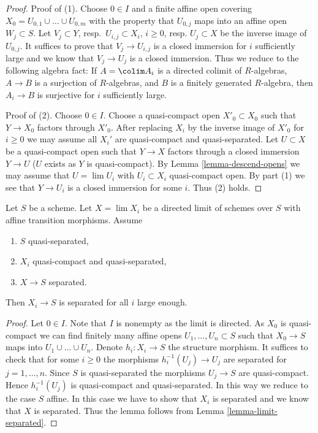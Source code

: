 \begin{proof}
Proof of (1). Choose $0 \in I$ and a finite affine open covering
$X_0 = U_{0, 1} \cup \ldots \cup U_{0, m}$ with the property that
$U_{0, j}$ maps into an affine open $W_j \subset S$.
Let $V_j \subset Y$, resp.\ $U_{i, j} \subset X_i$, $i \geq 0$,
resp. $U_j \subset X$ be the inverse image of $U_{0, j}$. It suffices
to prove that $V_j \to U_{i, j}$ is a closed immersion for $i$
sufficiently large and we know that $V_j \to U_j$ is a closed immersion.
Thus we reduce to the following algebra fact: If $A = \colim A_i$ is a
directed colimit of $R$-algebras, $A \to B$ is a surjection of $R$-algebras,
and $B$ is a finitely generated $R$-algebra, then
$A_i \to B$ is surjective for $i$ sufficiently large.

\medskip\noindent
Proof of (2). Choose $0 \in I$. Choose a quasi-compact open
$X'_0 \subset X_0$ such that $Y \to X_0$ factors through $X'_0$.
After replacing $X_i$ by the inverse image of $X'_0$ for $i \geq 0$
we may assume all $X_i'$ are quasi-compact and quasi-separated.
Let $U \subset X$ be a quasi-compact open such that $Y \to X$ factors
through a closed immersion $Y \to U$ ($U$ exists as $Y$ is quasi-compact). By
Lemma \ref{lemma-descend-opens}
we may assume that $U = \lim U_i$ with $U_i \subset X_i$ quasi-compact
open. By part (1) we see that $Y \to U_i$ is a closed immersion for some
$i$. Thus (2) holds.
\end{proof}

\begin{lemma}
\label{lemma-eventually-separated}
Let $S$ be a scheme. Let $X = \lim X_i$ be a directed
limit of schemes over $S$ with affine transition morphisms.
Assume
\begin{enumerate}
\item $S$ quasi-separated,
\item $X_i$ quasi-compact and quasi-separated,
\item $X \to S$ separated.
\end{enumerate}
Then $X_i \to S$ is separated for all $i$ large enough.
\end{lemma}

\begin{proof}
Let $0 \in I$. Note that $I$ is nonempty as the limit is directed.
As $X_0$ is quasi-compact we can find finitely many
affine opens $U_1, \ldots, U_n \subset S$ such that
$X_0 \to S$ maps into $U_1 \cup \ldots \cup U_n$.
Denote $h_i : X_i \to S$ the structure morphism.
It suffices to check that for some $i \geq 0$ the morphisms
$h_i^{-1}(U_j) \to U_j$ are separated for $j = 1, \ldots,  n$.
Since $S$ is quasi-separated the morphisms $U_j \to S$ are quasi-compact.
Hence $h_i^{-1}(U_j)$ is quasi-compact and quasi-separated.
In this way we reduce to the case $S$ affine. In this case we
have to show that $X_i$ is separated and we know that $X$ is separated.
Thus the lemma follows from Lemma \ref{lemma-limit-separated}.
\end{proof}

